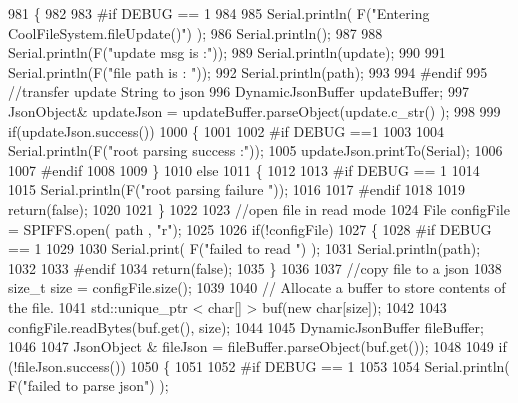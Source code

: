 \begin{DoxyCode}
981 \{
982 
983 \textcolor{preprocessor}{#if DEBUG == 1}
984 
985     Serial.println( F(\textcolor{stringliteral}{"Entering CoolFileSystem.fileUpdate()"}) );
986     Serial.println();
987     
988     Serial.println(F(\textcolor{stringliteral}{"update msg is :"}));
989     Serial.println(update);
990     
991     Serial.println(F(\textcolor{stringliteral}{"file path is : "}));
992     Serial.println(path);   
993 
994 \textcolor{preprocessor}{#endif}
995     \textcolor{comment}{//transfer update String to json}
996     DynamicJsonBuffer updateBuffer;
997     JsonObject& updateJson = updateBuffer.parseObject(update.c\_str() );
998     
999     \textcolor{keywordflow}{if}(updateJson.success())
1000     \{
1001     
1002 \textcolor{preprocessor}{    #if DEBUG ==1}
1003         
1004         Serial.println(F(\textcolor{stringliteral}{"root parsing success :"}));
1005         updateJson.printTo(Serial);
1006     
1007 \textcolor{preprocessor}{    #endif}
1008 
1009     \}
1010     \textcolor{keywordflow}{else}
1011     \{
1012     
1013 \textcolor{preprocessor}{    #if DEBUG == 1 }
1014     
1015         Serial.println(F(\textcolor{stringliteral}{"root parsing failure "}));
1016     
1017 \textcolor{preprocessor}{    #endif}
1018         
1019         \textcolor{keywordflow}{return}(\textcolor{keyword}{false});  
1020 
1021     \}
1022     
1023     \textcolor{comment}{//open file in read mode}
1024     File configFile = SPIFFS.open( path , \textcolor{stringliteral}{"r"});
1025     
1026     \textcolor{keywordflow}{if}(!configFile)
1027     \{   
1028 \textcolor{preprocessor}{    #if DEBUG == 1}
1029         
1030         Serial.print( F(\textcolor{stringliteral}{"failed to read "}) );
1031         Serial.println(path);
1032 
1033 \textcolor{preprocessor}{    #endif}
1034         \textcolor{keywordflow}{return}(\textcolor{keyword}{false});
1035     \}
1036 
1037     \textcolor{comment}{//copy file to a json}
1038     \textcolor{keywordtype}{size\_t} size = configFile.size();
1039 
1040     \textcolor{comment}{// Allocate a buffer to store contents of the file.}
1041     std::unique\_ptr < char[] > buf(\textcolor{keyword}{new} \textcolor{keywordtype}{char}[size]);
1042 
1043     configFile.readBytes(buf.get(), size);
1044 
1045     DynamicJsonBuffer fileBuffer;
1046 
1047     JsonObject & fileJson = fileBuffer.parseObject(buf.get());
1048 
1049     \textcolor{keywordflow}{if} (!fileJson.success())
1050     \{
1051 
1052 \textcolor{preprocessor}{    #if DEBUG == 1}
1053 
1054         Serial.println( F(\textcolor{stringliteral}{"failed to parse json"}) );

\end{DoxyCode}
